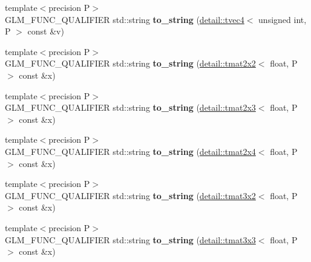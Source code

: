 \begin{DoxyCompactItemize}
\item 
\hypertarget{namespaceglm_a50a689738a61d3beddf88fbeae5ab2cc}{{\footnotesize template$<$precision P$>$ }\\G\-L\-M\-\_\-\-F\-U\-N\-C\-\_\-\-Q\-U\-A\-L\-I\-F\-I\-E\-R std\-::string {\bfseries to\-\_\-string} (\hyperlink{structglm_1_1detail_1_1tvec4}{detail\-::tvec4}$<$ unsigned int, P $>$ const \&v)}\label{namespaceglm_a50a689738a61d3beddf88fbeae5ab2cc}

\item 
\hypertarget{namespaceglm_a0eb5e5f8bfab4c965ed9f4d8f0ef910a}{{\footnotesize template$<$precision P$>$ }\\G\-L\-M\-\_\-\-F\-U\-N\-C\-\_\-\-Q\-U\-A\-L\-I\-F\-I\-E\-R std\-::string {\bfseries to\-\_\-string} (\hyperlink{structglm_1_1detail_1_1tmat2x2}{detail\-::tmat2x2}$<$ float, P $>$ const \&x)}\label{namespaceglm_a0eb5e5f8bfab4c965ed9f4d8f0ef910a}

\item 
\hypertarget{namespaceglm_ad89901ec5f12738b9a642525e49c8913}{{\footnotesize template$<$precision P$>$ }\\G\-L\-M\-\_\-\-F\-U\-N\-C\-\_\-\-Q\-U\-A\-L\-I\-F\-I\-E\-R std\-::string {\bfseries to\-\_\-string} (\hyperlink{structglm_1_1detail_1_1tmat2x3}{detail\-::tmat2x3}$<$ float, P $>$ const \&x)}\label{namespaceglm_ad89901ec5f12738b9a642525e49c8913}

\item 
\hypertarget{namespaceglm_a615c6db6a316268f62953ebb73948003}{{\footnotesize template$<$precision P$>$ }\\G\-L\-M\-\_\-\-F\-U\-N\-C\-\_\-\-Q\-U\-A\-L\-I\-F\-I\-E\-R std\-::string {\bfseries to\-\_\-string} (\hyperlink{structglm_1_1detail_1_1tmat2x4}{detail\-::tmat2x4}$<$ float, P $>$ const \&x)}\label{namespaceglm_a615c6db6a316268f62953ebb73948003}

\item 
\hypertarget{namespaceglm_a2f0a810251017c8150a5e3a3cffd6145}{{\footnotesize template$<$precision P$>$ }\\G\-L\-M\-\_\-\-F\-U\-N\-C\-\_\-\-Q\-U\-A\-L\-I\-F\-I\-E\-R std\-::string {\bfseries to\-\_\-string} (\hyperlink{structglm_1_1detail_1_1tmat3x2}{detail\-::tmat3x2}$<$ float, P $>$ const \&x)}\label{namespaceglm_a2f0a810251017c8150a5e3a3cffd6145}

\item 
\hypertarget{namespaceglm_a928a5ae6ba9cce412e20c4cc82420df5}{{\footnotesize template$<$precision P$>$ }\\G\-L\-M\-\_\-\-F\-U\-N\-C\-\_\-\-Q\-U\-A\-L\-I\-F\-I\-E\-R std\-::string {\bfseries to\-\_\-string} (\hyperlink{structglm_1_1detail_1_1tmat3x3}{detail\-::tmat3x3}$<$ float, P $>$ const \&x)}\label{namespaceglm_a928a5ae6ba9cce412e20c4cc82420df5}


\end{DoxyCompactItemize}
